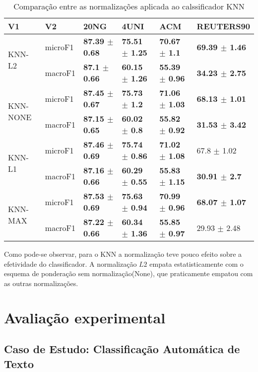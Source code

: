 \documentclass[]{article}
\begin{document}
\begin{table}[ht]
\centering
\begin{tabular}{llllll}
  \hline
V1 & V2 & 20NG & 4UNI & ACM & REUTERS90 \\ 
  \cline{3-6} \hline
\multirow{2}{*}{KNN-L2} & microF1 & \bf{87.39 $\pm$  0.68} & \bf{75.51 $\pm$  1.25} & \bf{70.67 $\pm$  1.1} & \bf{69.39 $\pm$  1.46} \\ 
   & macroF1 & \bf{87.1 $\pm$  0.66} & \bf{60.15 $\pm$  1.26} & \bf{55.39 $\pm$  0.96} & \bf{34.23 $\pm$  2.75} \\ 
   \cline{3-6}\multirow{2}{*}{KNN-NONE} & microF1 & \bf{87.45 $\pm$  0.67} & \bf{75.73 $\pm$  1.2} & \bf{71.06 $\pm$  1.03} & \bf{68.13 $\pm$  1.01} \\ 
   & macroF1 & \bf{87.15 $\pm$  0.65} & \bf{60.02 $\pm$  0.8} & \bf{55.82 $\pm$  0.92} & \bf{31.53 $\pm$  3.42} \\ 
   \cline{3-6}\multirow{2}{*}{KNN-L1} & microF1 & \bf{87.46 $\pm$  0.69} & \bf{75.74 $\pm$  0.86} & \bf{71.02 $\pm$  1.08} & 67.8 $\pm$  1.02 \\ 
   & macroF1 & \bf{87.16 $\pm$  0.66} & \bf{60.29 $\pm$  0.55} & \bf{55.83 $\pm$  1.15} & \bf{30.91 $\pm$  2.7} \\ 
   \cline{3-6}\multirow{2}{*}{KNN-MAX} & microF1 & \bf{87.53 $\pm$  0.69} & \bf{75.63 $\pm$  0.94} & \bf{70.99 $\pm$  0.96} & \bf{68.07 $\pm$  1.07} \\ 
   & macroF1 & \bf{87.22 $\pm$  0.66} & \bf{60.34 $\pm$  1.36} & \bf{55.85 $\pm$  0.97} & 29.93 $\pm$  2.48 \\ 
   \cline{3-6}\end{tabular}
\caption{Comparação entre as normalizações aplicada ao calssificador KNN} 
\end{table}

Como pode-se observar, para o KNN a normalização teve pouco efeito sobre
a efetividade do classificador. A normalização \(L2\) empata
estatisticamente com o esquema de ponderação sem normalização(None), que
praticamente empatou com as outras normalizações.

\chapter{Avaliação experimental}

\section{Caso de Estudo: Classificação Automática de
Texto}\label{caso-de-estudo-classificacao-automatica-de-texto}
\end{document}
